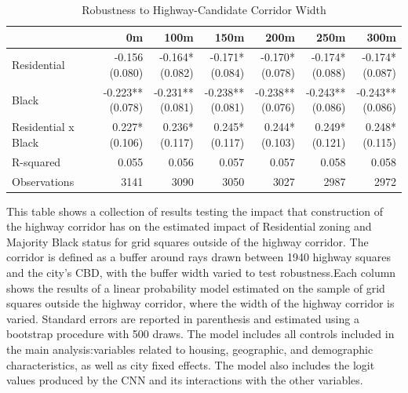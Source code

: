 \begin{table}[h]
\centering
\caption{Robustness to Highway-Candidate Corridor Width}
\label{tab:robustness/corridor_width}
\begin{threeparttable}
\begin{tabular*}{1.0\textwidth}{@{\extracolsep{\fill}}l*{6}{r}}
\toprule
 & 0m & 100m & 150m & 200m & 250m & 300m \\
\midrule
Residential & \makecell[tr]{-0.156 \\ (0.080)} & \makecell[tr]{-0.164{*} \\ (0.082)} & \makecell[tr]{-0.171{*} \\ (0.084)} & \makecell[tr]{-0.170{*} \\ (0.078)} & \makecell[tr]{-0.174{*} \\ (0.088)} & \makecell[tr]{-0.174{*} \\ (0.087)} \\
Black & \makecell[tr]{-0.223{**} \\ (0.078)} & \makecell[tr]{-0.231{**} \\ (0.081)} & \makecell[tr]{-0.238{**} \\ (0.081)} & \makecell[tr]{-0.238{**} \\ (0.076)} & \makecell[tr]{-0.243{**} \\ (0.086)} & \makecell[tr]{-0.243{**} \\ (0.086)} \\
Residential x Black & \makecell[tr]{0.227{*} \\ (0.106)} & \makecell[tr]{0.236{*} \\ (0.117)} & \makecell[tr]{0.245{*} \\ (0.117)} & \makecell[tr]{0.244{*} \\ (0.103)} & \makecell[tr]{0.249{*} \\ (0.121)} & \makecell[tr]{0.248{*} \\ (0.115)} \\
R-squared & 0.055 & 0.056 & 0.057 & 0.057 & 0.058 & 0.058 \\
Observations & 3141 & 3090 & 3050 & 3027 & 2987 & 2972 \\
\bottomrule
\end{tabular*}
\begin{tablenotes}[flushleft]
\footnotesize
\item This table shows a collection of results testing the impact that construction of the highway corridor has on the estimated impact of Residential zoning and Majority Black status for grid squares outside of the highway corridor. The corridor is defined as a buffer around rays drawn between 1940 highway squares and the city's CBD, with the buffer width varied to test robustness.Each column shows the results of a linear probability model estimated on the sample of grid squares outside the highway corridor, where the width of the highway corridor is varied. Standard errors are reported in parenthesis and estimated using a bootstrap procedure with 500 draws. The model includes all controls included in the main analysis:variables related to housing, geographic, and demographic characteristics, as well as city fixed effects. The model also includes the logit values produced by the CNN and its interactions with the other variables.

\end{tablenotes}
\end{threeparttable}
\end{table}
